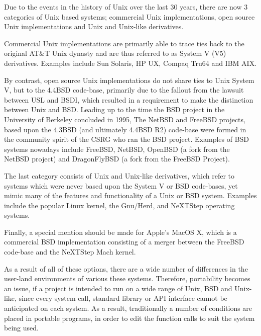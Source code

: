 
Due to the events in the history of Unix over the last 30 years, there
are now 3 categories of Unix based systems; commercial Unix
implementations, open source Unix implementations and Unix and Unix-like 
derivatives.


Commercial Unix implementations are primarily able to trace ties back to
the original AT\&T Unix dynasty and are thus referred to as System V (V5)
derivatives. Examples include Sun Solaris, HP UX, Compaq
Tru64 and IBM AIX. 


By contrast, open source Unix implementations do not share ties to Unix 
System V, but to the 4.4BSD code-base, primarily due to the fallout from 
the lawsuit between USL and BSDI, which resulted in a requirement to
make the distinction between Unix and BSD. Leading up to the time the 
BSD project in the University of Berkeley concluded in 1995, The NetBSD
and FreeBSD projects, based upon the 4.3BSD (and ultimately 4.4BSD R2) 
code-base were formed in the community spirit of the CSRG who ran the BSD
project. Examples of BSD systems nowadays include FreeBSD, NetBSD,
OpenBSD (a fork from the NetBSD project) and DragonFlyBSD (a fork from
the FreeBSD Project).


The last category consists of Unix and Unix-like derivatives, which
refer to systems which were never based upon the System V or BSD
code-bases, yet mimic many of the features and functionality of a Unix or
BSD system. Examples include the popular Linux kernel, the Gnu/Herd,
and NeXTStep operating systems.


Finally, a special mention should be made for Apple's MacOS X, which is
a commercial BSD implementation consisting of a merger between the
FreeBSD code-base and the NeXTStep Mach kernel.


As a result of all of these options, there are a wide number of
differences in the user-land environments of various these systems.
Therefore, portability becomes an issue, if a project is intended to run
on a wide range of Unix, BSD and Unix-like, since every system call, 
standard library or API interface cannot be anticipated on each system.
As a result, traditionally a number of conditions are placed in portable
programs, in order to edit the function calls to suit the system being
used.
